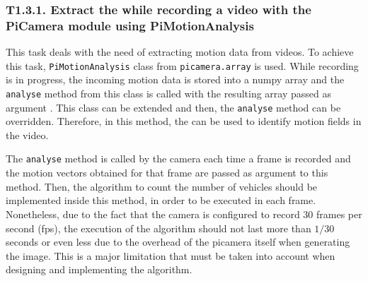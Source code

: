 

\subsubsection{T1.3.1. Extract the  while recording a video with the PiCamera module using PiMotionAnalysis}

This task deals with the need of extracting motion data from videos. To achieve this task, \texttt{PiMotionAnalysis} class from \texttt{picamera.array} is used. While recording is in progress, the incoming motion data is stored into a numpy array and the \texttt{analyse} method from this class is called with the resulting array passed as argument \cite{PiCameraDoc}. This class can be extended and then, the \texttt{analyse} method can be overridden. Therefore, in this method, the  can be used to identify motion fields in the video.

The \texttt{analyse} method is called by the camera each time a frame is recorded and the motion vectors obtained for that frame are passed as argument to this method. Then, the algorithm to count the number of vehicles should be implemented inside this method, in order to be executed in each frame. Nonetheless, due to the fact that the camera is configured to record 30 frames per second (fps), the execution of the algorithm should not last more than $1/30$ seconds or even less due to the overhead of the picamera itself when generating the image. This is a major limitation that must be taken into account when designing and implementing the algorithm.

